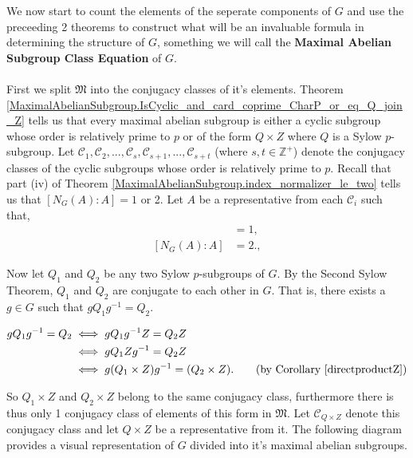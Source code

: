 We now start to count the elements of the seperate components of $G$ and use the preceeding 2 theorems to construct what will be an invaluable formula in determining the structure of $G$, something we will call the \textbf{Maximal Abelian Subgroup Class Equation} of $G$. \\
\\
First we split $\mathfrak{M}$ into the conjugacy classes of it's elements. Theorem \ref{MaximalAbelianSubgroup.IsCyclic_and_card_coprime_CharP_or_eq_Q_join_Z} tells us that every maximal abelian subgroup is either a cyclic subgroup whose order is relatively prime to $p$ or of the form $Q \times Z$ where $Q$ is a Sylow $p$-subgroup. Let $\mathcal{C}_1, \mathcal{C}_2,...,\mathcal{C}_s, \mathcal{C}_{s+1},..., \mathcal{C}_{s+t}$ (where $s, t \in \mathbb{Z}^+$) denote the conjugacy classes of the cyclic subgroups whose order is relatively prime to $p$. Recall that part (iv) of Theorem \ref{MaximalAbelianSubgroup.index_normalizer_le_two} tells us that $[N_G(A): A] = 1$ or 2. Let $A$ be a representative from each $\mathcal{C}_i$ such that,
\begin{align*} [N_G(A) : A] &= 1, \tag{for  $i \leq s$} \\[2mm]
[N_G(A) : A] &= 2. \tag{for  $s < i \leq s+t$}, \end{align*}

Now let $Q_1$ and $Q_2$ be any two Sylow $p$-subgroups of $G$. By the Second Sylow Theorem, $Q_1$ and $Q_2$ are conjugate to each other in $G$. That is, there exists a $g \in G$ such that $gQ_1g^{-1} = Q_2$.

\begin{align*} gQ_1g^{-1} = Q_2 &\iff gQ_1g^{-1}Z = Q_2Z 
\\ &\iff gQ_1Zg^{-1} = Q_2Z
\\ &\iff g(Q_1 \times Z)g^{-1} = (Q_2 \times Z). \tag{by Corollary \ref{directproductZ}}
\end{align*} 

So $Q_1 \times Z$ and $Q_2 \times Z$ belong to the same conjugacy class, furthermore there is thus only 1 conjugacy class of elements of this form in $\mathfrak{M}$. Let $\mathcal{C}_{Q \times Z}$ denote this conjugacy class and let $Q \times Z$ be a representative from it. The following diagram provides a visual representation of $G$ divided into it's maximal abelian subgroups.


